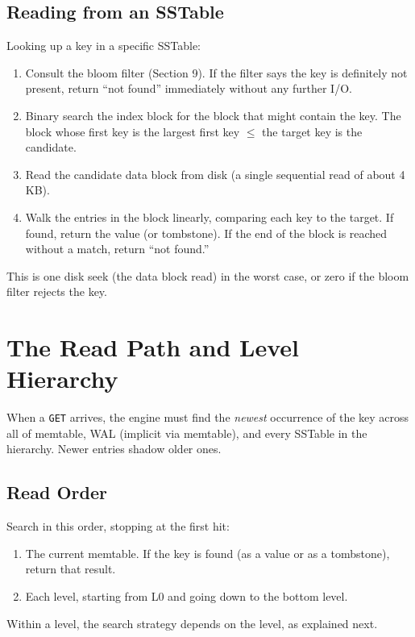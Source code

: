 \documentclass[11pt,a4paper]{article}
\begin{document}
\subsection{Reading from an SSTable}
Looking up a key in a specific SSTable:

\begin{enumerate}
\item Consult the bloom filter (Section 9). If the filter says the key is definitely not present, return ``not found'' immediately without any further I/O.
\item Binary search the index block for the block that might contain the key. The block whose first key is the largest first key $\leq$ the target key is the candidate.
\item Read the candidate data block from disk (a single sequential read of about 4 KB).
\item Walk the entries in the block linearly, comparing each key to the target. If found, return the value (or tombstone). If the end of the block is reached without a match, return ``not found.''
\end{enumerate}

This is one disk seek (the data block read) in the worst case, or zero if the bloom filter rejects the key.

\section{The Read Path and Level Hierarchy}

When a \texttt{GET} arrives, the engine must find the \textit{newest} occurrence of the key across all of memtable, WAL (implicit via memtable), and every SSTable in the hierarchy. Newer entries shadow older ones.

\subsection{Read Order}
Search in this order, stopping at the first hit:

\begin{enumerate}
\item The current memtable. If the key is found (as a value or as a tombstone), return that result.
\item Each level, starting from L0 and going down to the bottom level.
\end{enumerate}

Within a level, the search strategy depends on the level, as explained next.
\end{document}
